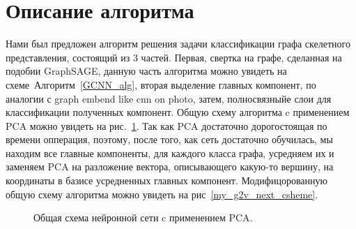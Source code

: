 \documentclass[12pt, twoside]{article}
\begin{document}
\section{Описание алгоритма}
Нами был предложен алгоритм решения задачи классификации графа скелетного представления, состоящий из 3 частей. Первая, свертка на графе, сделанная на подобии GraphSAGE, данную часть алгоритма можно увидеть на схеме~Алгоритм~\ref{GCNN_alg}, вторая выделение главных компонент, по аналогии с graph embend like cnn on photo, затем, полносвязныйе слои для классификации полученных компонент. Общую схему алгоритма c применением PCA можно увидеть на рис.~\ref{my_g2v_scheme}. Так как PCA достаточно дорогостоящая по времени опперация, поэтому, после того, как сеть достаточно обучилась, мы находим все главные компоненты, для каждого класса графа, усредняем их и заменяем PCA на разложение вектора, описывающего какую-то вершину, на координаты в базисе усредненных главных компонент. Модифицорованную общую схему алгоритма можно увидеть на рис~\ref{my_g2v_next_csheme}.
\begin{figure}[h]
\caption{Общая схема нейронной сети c применением PCA.}
\label{my_g2v_scheme}
\end{figure}
\end{document}
